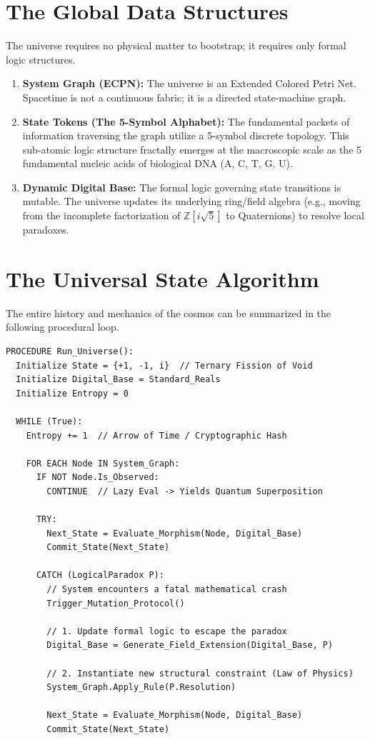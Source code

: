 \documentclass[11pt, a4paper]{article}
\begin{document}
\section{The Global Data Structures}
The universe requires no physical matter to bootstrap; it requires only formal logic structures.
\begin{enumerate}[label=\textbf{\arabic*.}]
    \item \textbf{System Graph (ECPN):} The universe is an Extended Colored Petri Net. Spacetime is not a continuous fabric; it is a directed state-machine graph.
    \item \textbf{State Tokens (The 5-Symbol Alphabet):} The fundamental packets of information traversing the graph utilize a 5-symbol discrete topology. This sub-atomic logic structure fractally emerges at the macroscopic scale as the 5 fundamental nucleic acids of biological DNA (A, C, T, G, U).
    \item \textbf{Dynamic Digital Base:} The formal logic governing state transitions is mutable. The universe updates its underlying ring/field algebra (e.g., moving from the incomplete factorization of $\mathbb{Z}[i\sqrt{5}]$ to Quaternions) to resolve local paradoxes.
\end{enumerate}

\section{The Universal State Algorithm}
The entire history and mechanics of the cosmos can be summarized in the following procedural loop.

\begin{verbatim}
PROCEDURE Run_Universe():
  Initialize State = {+1, -1, i}  // Ternary Fission of Void
  Initialize Digital_Base = Standard_Reals
  Initialize Entropy = 0
  
  WHILE (True):
    Entropy += 1  // Arrow of Time / Cryptographic Hash

    FOR EACH Node IN System_Graph:
      IF NOT Node.Is_Observed:
        CONTINUE  // Lazy Eval -> Yields Quantum Superposition

      TRY:
        Next_State = Evaluate_Morphism(Node, Digital_Base)
        Commit_State(Next_State)
      
      CATCH (LogicalParadox P):
        // System encounters a fatal mathematical crash
        Trigger_Mutation_Protocol()
        
        // 1. Update formal logic to escape the paradox
        Digital_Base = Generate_Field_Extension(Digital_Base, P)
        
        // 2. Instantiate new structural constraint (Law of Physics)
        System_Graph.Apply_Rule(P.Resolution)
        
        Next_State = Evaluate_Morphism(Node, Digital_Base)
        Commit_State(Next_State)
\end{verbatim}
\end{document}

